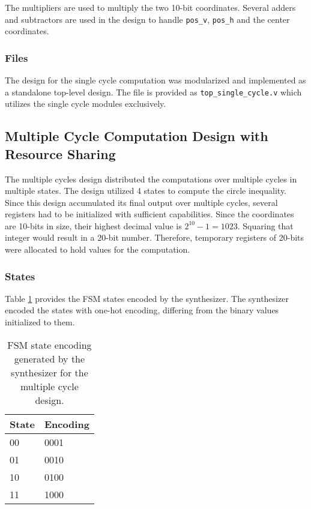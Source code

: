 \documentclass[paper=usletter, fontsize=12pt]{article}
\begin{document}
        The multipliers are used to multiply the two 10-bit coordinates.
        Several adders and subtractors are used in the design to handle
        \texttt{pos\_v}, \texttt{pos\_h} and the center coordinates.
        \newpage

        \subsubsection{Files} The design for the single cycle computation was
        modularized and implemented as a standalone top-level design. The file
        is provided as \texttt{top\_single\_cycle.v} which utilizes the single
        cycle modules exclusively.

        \subsection{Multiple Cycle Computation Design with Resource Sharing}
        The multiple cycles design distributed the computations over multiple
        cycles in multiple states. The design utilized 4 states to compute the
        circle inequality. Since this design accumulated its final output over
        multiple cycles, several registers had to be initialized with
        sufficient capabilities. Since the coordinates are 10-bits in size,
        their highest decimal value is $2^10-1=1023$. Squaring that integer
        would result in a 20-bit number. Therefore, temporary registers of
        20-bits were allocated to hold values for the computation.

        \subsubsection{States} Table \ref{table:multifsmcode} provides the FSM
        states encoded by the synthesizer. The synthesizer encoded the states
        with one-hot encoding, differing from the binary values initialized to
        them.

        \begin{table}[h]
            \caption{FSM state encoding generated by the synthesizer for the
            multiple cycle design.}
            \label{table:multifsmcode}
            \centering
            \begin{tabular}{ m{5em}m{5em} }
                \hline
                \textbf{State}  &   \textbf{Encoding} \\
                \hline
                00              &   0001 \\
                01              &   0010 \\
                10              &   0100 \\
                11              &   1000 \\
                \hline
            \end{tabular}
        \end{table}
\end{document}
